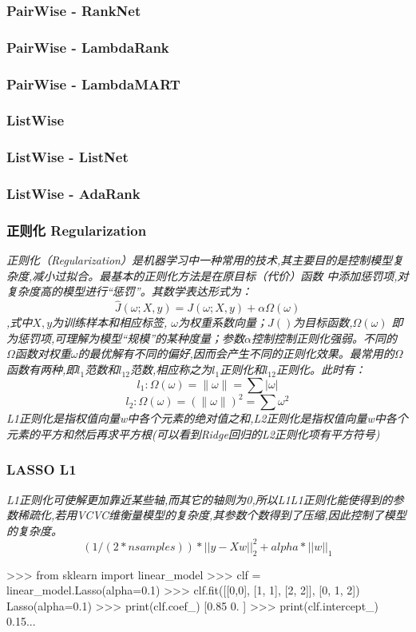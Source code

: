 \documentclass{scrartcl}
\numberwithin{equation}{section}
\begin{document}
\subsubsection{PairWise - RankNet}
\subsubsection{PairWise - LambdaRank}
\subsubsection{PairWise - LambdaMART}
\subsubsection{ListWise}
\subsubsection{ListWise - ListNet}
\subsubsection{ListWise - AdaRank}

\subsubsection{正则化 Regularization}

\textsl{
    正则化（Regularization）是机器学习中一种常用的技术,其主要目的是控制模型复杂度,减小过拟合。最基本的正则化方法是在原目标（代价）函数 中添加惩罚项,对复杂度高的模型进行“惩罚”。其数学表达形式为：
    $$\hat{J}(\omega; X, y) = J(\omega; X, y) + \alpha \Omega(\omega)$$,式中$X, y$为训练样本和相应标签, $\omega$为权重系数向量；$J()$为目标函数,$\Omega(\omega)$ 即为惩罚项,可理解为模型“规模”的某种度量；参数$\alpha$控制控制正则化强弱。不同的 $\Omega$函数对权重$\omega$的最优解有不同的偏好,因而会产生不同的正则化效果。最常用的$\Omega$函数有两种,即$l_1$范数和$l_12$范数,相应称之为$l_1$正则化和$l_12$正则化。此时有：$$l_1: \Omega(\omega) =\left\lVert \omega \right\rVert = \sum \left\lvert \omega \right\rvert  $$
    $$l_2: \Omega(\omega) =(\left\lVert \omega \right\rVert)^2 = \sum  \omega^2   $$L1正则化是指权值向量w中各个元素的绝对值之和,L2正则化是指权值向量w中各个元素的平方和然后再求平方根(可以看到Ridge回归的L2正则化项有平方符号)
}


\subsubsection{LASSO  L1}
\textsl{L1正则化可使解更加靠近某些轴,而其它的轴则为0,所以L1L1正则化能使得到的参数稀疏化,若用VCVC维衡量模型的复杂度,其参数个数得到了压缩,因此控制了模型的复杂度。}
$$(1 / (2 * nsamples)) * ||y - Xw||^2_2 + alpha * ||w||_1$$
\begin{python}
>>> from sklearn import linear_model
>>> clf = linear_model.Lasso(alpha=0.1)
>>> clf.fit([[0,0], [1, 1], [2, 2]], [0, 1, 2])
Lasso(alpha=0.1)
>>> print(clf.coef_)
[0.85 0.  ]
>>> print(clf.intercept_)
0.15...
\end{python}
\end{document}
